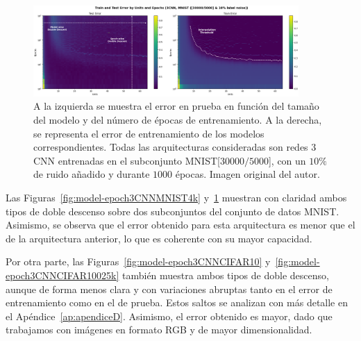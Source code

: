 \begin{figure}[h]
    \centering
    \includegraphics[width=0.9\textwidth]{img/experiments/model-epoch3CNNMNIST30k.png}
    \caption[Doble descenso en función del tamaño del modelo y del número de épocas para la red $3$CNN y un subconjunto de MNIST.]{A la izquierda se muestra el error en prueba en función del tamaño del modelo y del número de épocas de entrenamiento. A la derecha, se representa el error de entrenamiento de los modelos correspondientes. Todas las arquitecturas consideradas son redes $3$CNN entrenadas en el subconjunto MNIST[$30000/5000$], con un $10\%$ de ruido añadido y durante $1000$ épocas. Imagen original del autor.}\label{fig:model-epoch3CNNMNIST30k}
\end{figure}

Las Figuras~\ref{fig:model-epoch3CNNMNIST4k} y~\ref{fig:model-epoch3CNNMNIST30k} muestran con claridad ambos tipos de doble descenso sobre dos subconjuntos del conjunto de datos MNIST. Asimismo, se observa que el error obtenido para esta arquitectura es menor que el de la arquitectura anterior, lo que es coherente con su mayor capacidad.\newline

Por otra parte, las Figuras~\ref{fig:model-epoch3CNNCIFAR10} y~\ref{fig:model-epoch3CNNCIFAR10025k} también muestra ambos tipos de doble descenso, aunque de forma menos clara y con variaciones abruptas tanto en el error de entrenamiento como en el de prueba. Estos saltos se analizan con más detalle en el Apéndice~\ref{ap:apendiceD}. Asimismo, el error obtenido es mayor, dado que trabajamos con imágenes en formato RGB y de mayor dimensionalidad.\newline

